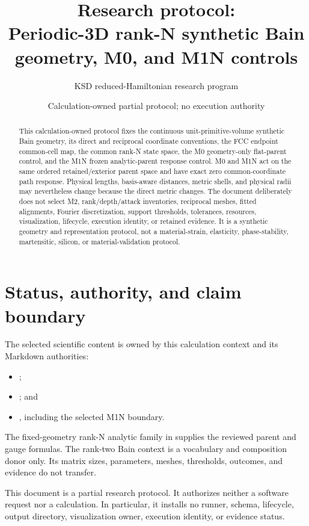 \documentclass[11pt]{article}
\title{\textbf{Research protocol:\\
Periodic-3D rank-N synthetic Bain geometry, M0, and M1N controls}}
\author{KSD reduced-Hamiltonian research program}
\date{Calculation-owned partial protocol; no execution authority}
\begin{document}
\maketitle

\begin{abstract}
This calculation-owned protocol fixes the continuous unit-primitive-volume synthetic
Bain geometry, its direct and reciprocal coordinate conventions, the FCC endpoint
common-cell map, the common rank-N state space, the M0 geometry-only flat-parent
control, and the M1N frozen analytic-parent response control.  M0 and M1N act on the
same ordered retained/exterior parent space and have exact zero common-coordinate path
response.  Physical lengths, basis-aware distances, metric shells, and physical radii
may nevertheless change because the direct metric changes.  The document deliberately
does not select M2, rank/depth/attack inventories, reciprocal meshes, fitted alignments,
Fourier discretization, support thresholds, tolerances, resources, visualization,
lifecycle, execution identity, or retained evidence.  It is a synthetic geometry and
representation protocol, not a material-strain, elasticity, phase-stability,
martensitic, silicon, or material-validation protocol.
\end{abstract}

\section{Status, authority, and claim boundary}

The selected scientific content is owned by this calculation context and its Markdown
authorities:
\begin{itemize}[leftmargin=*]
  \item {};
  \item {}; and
  \item {}, including the selected M1N boundary.
\end{itemize}
The fixed-geometry rank-N analytic family in
 supplies the reviewed parent and gauge
formulas.  The rank-two Bain context is a vocabulary and composition donor only.  Its
matrix sizes, parameters, meshes, thresholds, outcomes, and evidence do not transfer.

This document is a partial research protocol.  It authorizes neither a software request
nor a calculation.  In particular, it installs no runner, schema, lifecycle, output
directory, visualization owner, execution identity, or evidence status.
\end{document}
